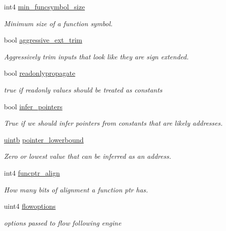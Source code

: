 \begin{DoxyCompactItemize}
int4 \mbox{\hyperlink{class_architecture_aa5c79b6eca1b3c98884bb53c90bf417d}{min\+\_\+funcsymbol\+\_\+size}}
\begin{DoxyCompactList}\small\item\em Minimum size of a function symbol. \end{DoxyCompactList}\item 
bool \mbox{\hyperlink{class_architecture_a51c3648c6133efc1d5115b86dd10115a}{aggressive\+\_\+ext\+\_\+trim}}
\begin{DoxyCompactList}\small\item\em Aggressively trim inputs that look like they are sign extended. \end{DoxyCompactList}\item 
bool \mbox{\hyperlink{class_architecture_a64c49555bfdee44b82f3a9a98005ed0d}{readonlypropagate}}
\begin{DoxyCompactList}\small\item\em true if readonly values should be treated as constants \end{DoxyCompactList}\item 
bool \mbox{\hyperlink{class_architecture_adbeb3c604a337ce88bd4e9d8beb78806}{infer\+\_\+pointers}}
\begin{DoxyCompactList}\small\item\em True if we should infer pointers from constants that are likely addresses. \end{DoxyCompactList}\item 
\mbox{\hyperlink{types_8h_a2db313c5d32a12b01d26ac9b3bca178f}{uintb}} \mbox{\hyperlink{class_architecture_aa6544ee69038548a7f09157beb38e8d4}{pointer\+\_\+lowerbound}}
\begin{DoxyCompactList}\small\item\em Zero or lowest value that can be inferred as an address. \end{DoxyCompactList}\item 
int4 \mbox{\hyperlink{class_architecture_af1b94f4312717f6cd89eb784e3e73611}{funcptr\+\_\+align}}
\begin{DoxyCompactList}\small\item\em How many bits of alignment a function ptr has. \end{DoxyCompactList}\item 
uint4 \mbox{\hyperlink{class_architecture_a4ed18744b8dc08d3ca81d6b1b6df682e}{flowoptions}}
\begin{DoxyCompactList}\small\item\em options passed to flow following engine \end{DoxyCompactList}\item 

\end{DoxyCompactItemize}

